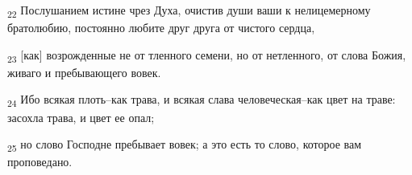 \begin{tcolorbox}
\textsubscript{22} Послушанием истине чрез Духа, очистив души ваши к нелицемерному братолюбию, постоянно любите друг друга от чистого сердца,
\end{tcolorbox}
\begin{tcolorbox}
\textsubscript{23} [как] возрожденные не от тленного семени, но от нетленного, от слова Божия, живаго и пребывающего вовек.
\end{tcolorbox}
\begin{tcolorbox}
\textsubscript{24} Ибо всякая плоть--как трава, и всякая слава человеческая--как цвет на траве: засохла трава, и цвет ее опал;
\end{tcolorbox}
\begin{tcolorbox}
\textsubscript{25} но слово Господне пребывает вовек; а это есть то слово, которое вам проповедано.
\end{tcolorbox}
